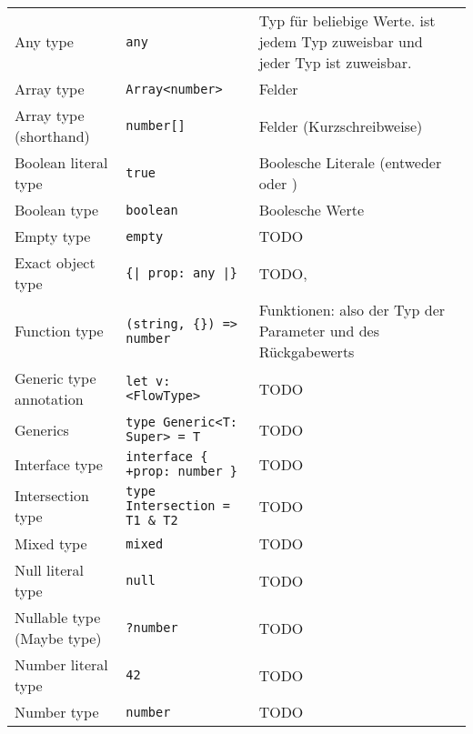 \bigbreak
\begin{footnotesize}
\begin{longtabu} to 
  \midrule
   &  &  \\
  \midrule
  \endhead
  \midrule
  \endfoot
  \endlastfoot
  Any type                   & \texttt{any}                             & Typ für beliebige Werte.  ist jedem Typ zuweisbar und jeder Typ ist  zuweisbar. \\
  Array type                 & \texttt{Array<{}number>{}}               & Felder \\
  Array type (shorthand)     & \texttt{number[]}                        & Felder (Kurzschreibweise) \\
  Boolean literal type       & \texttt{true}                            & Boolesche Literale (entweder  oder ) \\
  Boolean type               & \texttt{boolean}                         & Boolesche Werte \\
  Empty type                 & \texttt{empty}                           & TODO \\
  Exact object type          & \texttt{\{| prop: any |\}}               & TODO, \\
  Function type              & \texttt{(string, \{\}) => number}        & Funktionen: also der Typ der Parameter und des Rückgabewerts \\
  Generic type annotation    & \texttt{let v: <{}FlowType>{}}           & TODO \\
  Generics                   & \texttt{type Generic<{}T: Super> = T}    & TODO \\
  Interface type             & \texttt{interface \{ +prop: number \}}   & TODO \\
  Intersection type          & \texttt{type Intersection = T1 \& T2}    & TODO \\
  Mixed type                 & \texttt{mixed}                           & TODO \\
  Null literal type          & \texttt{null}                            & TODO \\
  Nullable type (Maybe type) & \texttt{?number}                         & TODO \\
  Number literal type        & \texttt{42}                              & TODO \\
  Number type                & \texttt{number}                          & TODO \\

\end{longtabu}
\end{footnotesize}
